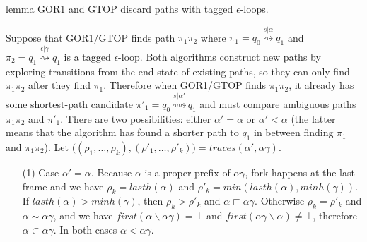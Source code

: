 \documentclass[AMA,STIX1COL]{WileyNJD-v2}
\begin{document}
\vspace{-0.5em}

\begin{theoremEnd}[restate, no link to proof, no link to theorem, category=lemmata_closure]{lemma}
    \label{lemma_closure_noloop}
    GOR1 and GTOP discard paths with tagged $\epsilon$-loops.
\end{theoremEnd}
\begin{proofEnd}
    Suppose that GOR1/GTOP finds path $\pi_1 \pi_2$
    where $\pi_1 = q_0 \overset {s | \alpha} {\rightsquigarrow} q_1$
    and $\pi_2 = q_1 \overset {\epsilon | \gamma} {\rightsquigarrow} q_1$ is a tagged $\epsilon$-loop.
    Both algorithms construct new paths by exploring transitions from the end state of existing paths,
    so they can only find $\pi_1 \pi_2$ after they find $\pi_1$.
    Therefore when GOR1/GTOP finds $\pi_1 \pi_2$,
    it already has some shortest-path candidate $\pi'_1 = q_0 \overset {s | \alpha'} {\rightsquigarrow} q_1$
    and must compare ambiguous paths $\pi_1 \pi_2$ and $\pi'_1$.
    There are two possibilities: either $\alpha' = \alpha$
    or $\alpha' < \alpha$ (the latter means that the algorithm has found
    a shorter path to $q_1$ in between finding $\pi_1$ and $\pi_1 \pi_2$).
    Let $\big( (\rho_1, \hdots, \rho_k), (\rho'_1, \hdots, \rho'_k) \big) = traces (\alpha', \alpha \gamma)$.
    \begin{itemize}[itemsep=0.5em, topsep=0.5em]
    \item[(1)]
        Case $\alpha' = \alpha$.
        Because $\alpha$ is a proper prefix of $\alpha \gamma$,
        fork happens at the last frame and we have
        $\rho_k = lasth(\alpha)$ and
        $\rho'_k = min (lasth(\alpha), minh(\gamma))$.
        If $lasth(\alpha) > minh(\gamma)$, then $\rho_k > \rho'_k$ and $\alpha \sqsubset \alpha \gamma$.
        Otherwise $\rho_k = \rho'_k$ and $\alpha \sim \alpha \gamma$,
        and we have $first(\alpha \backslash \alpha \gamma) = \bot$ and $first(\alpha \gamma \backslash \alpha) \neq \bot$,
        therefore $\alpha \subset \alpha \gamma$.
        In both cases $\alpha < \alpha \gamma$.


\end{itemize}
\end{proofEnd}
\end{document}
